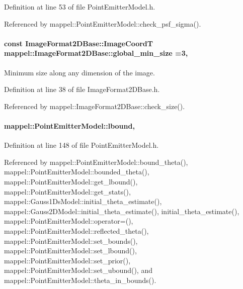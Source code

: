 Definition at line 53 of file Point\+Emitter\+Model.\+h.



Referenced by mappel\+::\+Point\+Emitter\+Model\+::check\+\_\+psf\+\_\+sigma().

\paragraph[{\texorpdfstring{global\+\_\+min\+\_\+size}{global_min_size}}]{\setlength{\rightskip}{0pt plus 5cm}const {\bf Image\+Format2\+D\+Base\+::\+Image\+CoordT} mappel\+::\+Image\+Format2\+D\+Base\+::global\+\_\+min\+\_\+size =3\hspace{0.3cm}{\ttfamily [static]}, {\ttfamily [inherited]}}\hypertarget{classmappel_1_1ImageFormat2DBase_a1149e8545d3cfaa40c2f3bc02e3223b2}{}\label{classmappel_1_1ImageFormat2DBase_a1149e8545d3cfaa40c2f3bc02e3223b2}
Minimum size along any dimension of the image. 

Definition at line 38 of file Image\+Format2\+D\+Base.\+h.



Referenced by mappel\+::\+Image\+Format2\+D\+Base\+::check\+\_\+size().

\paragraph[{\texorpdfstring{lbound}{lbound}}]{ mappel\+::\+Point\+Emitter\+Model\+::lbound\hspace{0.3cm}{\ttfamily [protected]}, {\ttfamily [inherited]}}\hypertarget{classmappel_1_1PointEmitterModel_a889bc82f74cfa654da121e5770296ab2}{}\label{classmappel_1_1PointEmitterModel_a889bc82f74cfa654da121e5770296ab2}


Definition at line 148 of file Point\+Emitter\+Model.\+h.



Referenced by mappel\+::\+Point\+Emitter\+Model\+::bound\+\_\+theta(), mappel\+::\+Point\+Emitter\+Model\+::bounded\+\_\+theta(), mappel\+::\+Point\+Emitter\+Model\+::get\+\_\+lbound(), mappel\+::\+Point\+Emitter\+Model\+::get\+\_\+stats(), mappel\+::\+Gauss1\+Ds\+Model\+::initial\+\_\+theta\+\_\+estimate(), mappel\+::\+Gauss2\+D\+Model\+::initial\+\_\+theta\+\_\+estimate(), initial\+\_\+theta\+\_\+estimate(), mappel\+::\+Point\+Emitter\+Model\+::operator=(), mappel\+::\+Point\+Emitter\+Model\+::reflected\+\_\+theta(), mappel\+::\+Point\+Emitter\+Model\+::set\+\_\+bounds(), mappel\+::\+Point\+Emitter\+Model\+::set\+\_\+lbound(), mappel\+::\+Point\+Emitter\+Model\+::set\+\_\+prior(), mappel\+::\+Point\+Emitter\+Model\+::set\+\_\+ubound(), and mappel\+::\+Point\+Emitter\+Model\+::theta\+\_\+in\+\_\+bounds().

